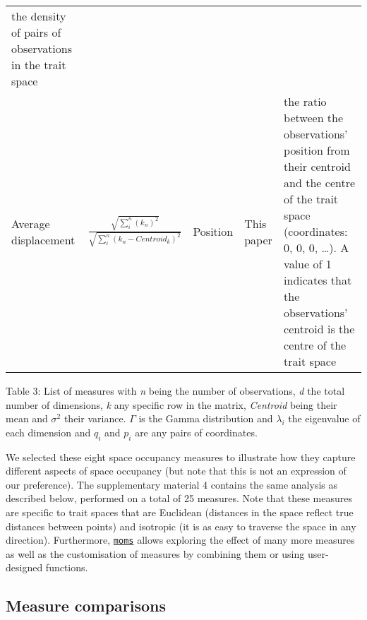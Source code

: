 \documentclass[]{article}
\begin{document}
\begin{longtable}[]{@{}lllll@{}}
\begin{minipage}[t]{0.11\columnwidth}
the density of pairs of observations in the trait space\strut
\end{minipage}\tabularnewline
\begin{minipage}[t]{0.08\columnwidth}\raggedright\strut
Average displacement\strut
\end{minipage} & \begin{minipage}[t]{0.16\columnwidth}\raggedright\strut
\(\frac{\sqrt{\sum_{i}^{n}{({k}_{n})^2}}}{\sqrt{\sum_{i}^{n}{({k}_{n}-Centroid_{k})^2}}}\)\strut
\end{minipage} & \begin{minipage}[t]{0.13\columnwidth}\raggedright\strut
Position\strut
\end{minipage} & \begin{minipage}[t]{0.11\columnwidth}\raggedright\strut
This paper\strut
\end{minipage} & \begin{minipage}[t]{0.11\columnwidth}\raggedright\strut
the ratio between the observations' position from their centroid and the
centre of the trait space (coordinates: 0, 0, 0, \ldots{}). A value of 1
indicates that the observations' centroid is the centre of the trait
space\strut
\end{minipage}\tabularnewline
\bottomrule
\end{longtable}

Table 3: List of measures with \emph{n} being the number of
observations, \emph{d} the total number of dimensions, \emph{k} any
specific row in the matrix, \emph{Centroid} being their mean and
\(\sigma^{2}\) their variance. \(\Gamma\) is the Gamma distribution and
\(\lambda_{i}\) the eigenvalue of each dimension and \({q}_{i}\) and
\(p_{i}\) are any pairs of coordinates.

We selected these eight space occupancy measures to illustrate how they
capture different aspects of space occupancy (but note that this is not
an expression of our preference). The supplementary material 4 contains
the same analysis as described below, performed on a total of 25
measures. Note that these measures are specific to trait spaces that are
Euclidean (distances in the space reflect true distances between points)
and isotropic (it is as easy to traverse the space in any direction).
Furthermore, \href{https://tguillerme.shinyapps.io/moms/}{\texttt{moms}}
allows exploring the effect of many more measures as well as the
customisation of measures by combining them or using user-designed
functions.

\subsection{Measure comparisons}\label{measure-comparisons}
\end{document}
